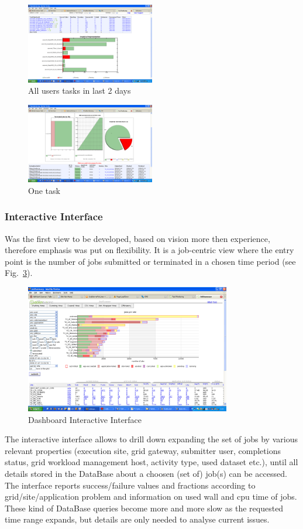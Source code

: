 \begin{figure}
 \includegraphics[width=0.50\textwidth]{figures/TaskMonitor1.png}
\caption{All users tasks in last 2 days}
\label{fig:TaskMonitor1}
\end{figure}
\begin{figure}
 \includegraphics[width=0.50\textwidth]{figures/TaskMonitor2.png}
\caption{One task}
\label{fig:TaskMonitor2}
\end{figure}

\subsubsection{Interactive Interface}
Was the first view to be developed, based on
vision more then experience, therefore
emphasis was put on flexibility. It is a job-centric view
where the entry point is the number of jobs submitted or
terminated in a chosen time period (see Fig.~\ref{fig:Dashboard}).
\begin{figure}
 \includegraphics[width=0.80\textwidth]{figures/DashboardInteractive.png}
\caption{Dashboard Interactive Interface}
\label{fig:Dashboard}
\end{figure}
The interactive interface
allows to drill down expanding the set of jobs by
various relevant properties (execution site, grid gateway,
submitter user, completions status, grid workload management host,
activity type, used dataset etc.), until all details stored in the DataBase
about a choosen (set of) job(s) can be accessed.
The interface reports success/failure values and fractions
according to grid/site/application problem and information
on used wall and cpu time of jobs.
These kind of DataBase queries become more and more slow as the requested
time range expands, but details are only needed to analyse current issues.


